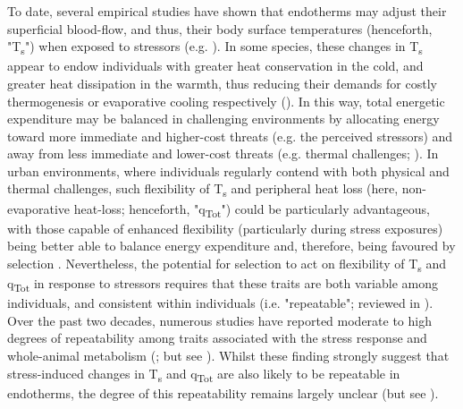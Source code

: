 \documentclass[12pt]{article}
\begin{document}
\noindent To date, several empirical studies have shown that endotherms may adjust their superficial blood-flow, and thus, their body surface temperatures (henceforth, "T\textsubscript{s}") when exposed to stressors (e.g. \citealt{blair_1959,yokoi_1966,nord_2019b,winder_2020}). In some species, these changes in T\textsubscript{s} appear to endow individuals with greater heat conservation in the cold, and greater heat dissipation in the warmth, thus reducing their demands for costly thermogenesis or evaporative cooling respectively (\citealt{jerem_2018,robertson_2020a,winder_2020}). In this way, total energetic expenditure may be balanced in challenging environments by allocating energy toward more immediate and higher-cost threats (e.g. the perceived stressors) and away from less immediate and lower-cost threats (e.g. thermal challenges; \citealt{jerem_2018,robertson_2020a}). In urban environments, where individuals regularly contend with both physical and thermal challenges, such flexibility of T\textsubscript{s} and peripheral heat loss (here, non-evaporative heat-loss; henceforth, "q\textsubscript{Tot}") could be particularly advantageous, with those capable of enhanced flexibility (particularly during stress exposures) being better able to balance energy expenditure and, therefore, being favoured by selection \citep{parsons_2005}. Nevertheless, the potential for selection to act on flexibility of T\textsubscript{s} and q\textsubscript{Tot} in response to stressors requires that these traits are both variable among individuals, and consistent within individuals (i.e. "repeatable"; reviewed in \citealt{boake_1989,wolak_2012}). Over the past two decades, numerous studies have reported moderate to high degrees of repeatability among traits associated with the stress response and whole-animal metabolism (\citealt{nespolo_2007,rensel_2011,muller_2018,boratynski_2019}; but see \citealt{ouyang_2011}). Whilst these finding strongly suggest that stress-induced changes in T\textsubscript{s} and q\textsubscript{Tot} are also likely to be repeatable in endotherms, the degree of this repeatability remains largely unclear (but see \citealt{careau_2012}). \vspace{1cm}
\end{document}
